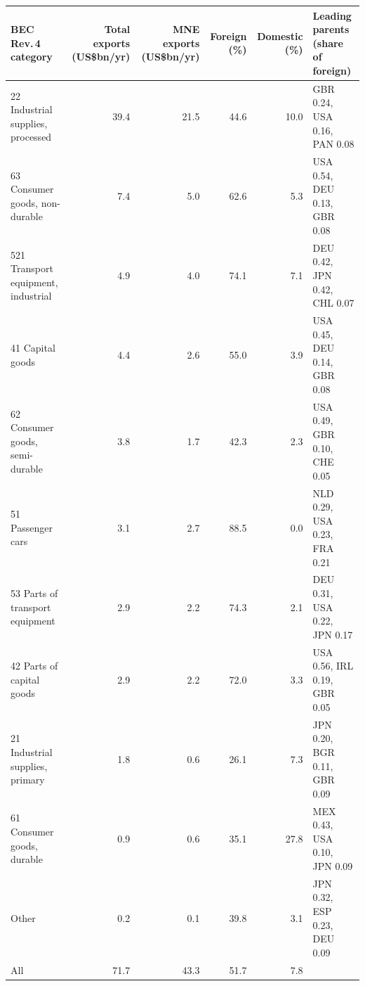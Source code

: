 \begin{tabular}{@{}l r r r r l@{}}
\toprule
BEC Rev.\,4 category & Total exports (US\$bn/yr) & MNE exports (US\$bn/yr) & Foreign (\%) & Domestic (\%) & Leading parents (share of foreign) \\
\midrule
22 Industrial supplies, processed & 39.4 & 21.5 & 44.6 & 10.0 & GBR 0.24, USA 0.16, PAN 0.08 \\
63 Consumer goods, non-durable & 7.4 & 5.0 & 62.6 & 5.3 & USA 0.54, DEU 0.13, GBR 0.08 \\
521 Transport equipment, industrial & 4.9 & 4.0 & 74.1 & 7.1 & DEU 0.42, JPN 0.42, CHL 0.07 \\
41 Capital goods & 4.4 & 2.6 & 55.0 & 3.9 & USA 0.45, DEU 0.14, GBR 0.08 \\
62 Consumer goods, semi-durable & 3.8 & 1.7 & 42.3 & 2.3 & USA 0.49, GBR 0.10, CHE 0.05 \\
51 Passenger cars & 3.1 & 2.7 & 88.5 & 0.0 & NLD 0.29, USA 0.23, FRA 0.21 \\
53 Parts of transport equipment & 2.9 & 2.2 & 74.3 & 2.1 & DEU 0.31, USA 0.22, JPN 0.17 \\
42 Parts of capital goods & 2.9 & 2.2 & 72.0 & 3.3 & USA 0.56, IRL 0.19, GBR 0.05 \\
21 Industrial supplies, primary & 1.8 & 0.6 & 26.1 & 7.3 & JPN 0.20, BGR 0.11, GBR 0.09 \\
61 Consumer goods, durable & 0.9 & 0.6 & 35.1 & 27.8 & MEX 0.43, USA 0.10, JPN 0.09 \\
Other & 0.2 & 0.1 & 39.8 & 3.1 & JPN 0.32, ESP 0.23, DEU 0.09 \\
\midrule
All & 71.7 & 43.3 & 51.7 & 7.8 & \\
\bottomrule
\end{tabular}
